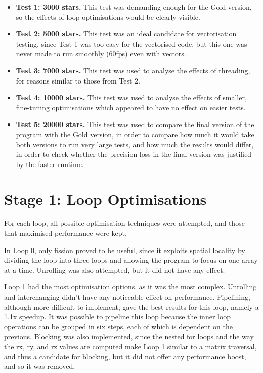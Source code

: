 \documentclass[10pt,a4paper]{article}
\begin{document}
\begin{itemize}
	\item \textbf{Test 1: 3000 stars.} This test was demanding enough for the Gold version, so the effects of loop optimisations would be clearly visible.
	\item \textbf{Test 2: 5000 stars.} This test was an ideal candidate for vectorisation testing, since Test 1 was too easy for the vectorised code, but this one was never made to run smoothly (60fps) even with vectors.
	\item \textbf{Test 3: 7000 stars.} This test was used to analyse the effects of threading, for reasons similar to those from Test 2.
	\item \textbf{Test 4: 10000 stars.} This test was used to analyse the effects of smaller, fine-tuning optimisations which appeared to have no effect on easier tests.
	\item \textbf{Test 5: 20000 stars.} This test was used to compare the final version of the program with the Gold version, in order to compare how much it would take both versions to run very large tests, and how much the results would differ, in order to check whether the precision loss in the final version was justified by the faster runtime.
\end{itemize}

\section*{Stage 1: Loop Optimisations}

For each loop, all possible optimisation techniques were attempted, and those that maximised performance were kept.

In Loop 0, only fission proved to be useful, since it exploits spatial locality by dividing the loop into three loops and allowing the program to focus on one array at a time. Unrolling was also attempted, but it did not have any effect.

Loop 1 had the most optimisation options, as it was the most complex. Unrolling and interchanging didn't have any noticeable effect on performance. Pipelining, although more difficult to implement, gave the best results for this loop, namely a 1.1x speedup. It was possible to pipeline this loop because the inner loop operations can be grouped in six steps, each of which is dependent on the previous. Blocking was also implemented, since the nested for loops and the way the rx, ry, and rz values are computed make Loop 1 similar to a matrix traversal, and thus a candidate for blocking, but it did not offer any performance boost, and so it was removed.
\end{document}
